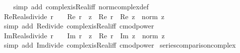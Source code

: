 \begin{isabellebody}
%
\isadelimproof
\ \ %
\endisadelimproof
%
\isatagproof
{}\isamarkupfalse%
\ {\isacharparenleft}{\kern0pt}simp\ add{\isacharcolon}{\kern0pt}\ complex{\isacharunderscore}{\kern0pt}is{\isacharunderscore}{\kern0pt}Real{\isacharunderscore}{\kern0pt}iff\ norm{\isacharunderscore}{\kern0pt}complex{\isacharunderscore}{\kern0pt}def{\isacharparenright}{\kern0pt}%
\endisatagproof
{\isafoldproof}%
%
\isadelimproof
\isanewline
%
\endisadelimproof
\isanewline
{}\isamarkupfalse%
\ Re{\isacharunderscore}{\kern0pt}Reals{\isacharunderscore}{\kern0pt}divide{\isacharcolon}{\kern0pt}\ {\isachardoublequoteopen}r\ {\isasymin}\ {\isasymreal}\ {\isasymLongrightarrow}\ Re\ {\isacharparenleft}{\kern0pt}r\ {\isacharslash}{\kern0pt}\ z{\isacharparenright}{\kern0pt}\ {\isacharequal}{\kern0pt}\ Re\ r\ {\isacharasterisk}{\kern0pt}\ Re\ z\ {\isacharslash}{\kern0pt}\ {\isacharparenleft}{\kern0pt}norm\ z{\isacharparenright}{\kern0pt}\isanewline
%
\isadelimproof
\ \ %
\endisadelimproof
%
\isatagproof
{}\isamarkupfalse%
\ {\isacharparenleft}{\kern0pt}simp\ add{\isacharcolon}{\kern0pt}\ Re{\isacharunderscore}{\kern0pt}divide\ complex{\isacharunderscore}{\kern0pt}is{\isacharunderscore}{\kern0pt}Real{\isacharunderscore}{\kern0pt}iff\ cmod{\isacharunderscore}{\kern0pt}power{}{\isacharparenright}{\kern0pt}%
\endisatagproof
{\isafoldproof}%
%
\isadelimproof
\isanewline
%
\endisadelimproof
\isanewline
{}\isamarkupfalse%
\ Im{\isacharunderscore}{\kern0pt}Reals{\isacharunderscore}{\kern0pt}divide{\isacharcolon}{\kern0pt}\ {\isachardoublequoteopen}r\ {\isasymin}\ {\isasymreal}\ {\isasymLongrightarrow}\ Im\ {\isacharparenleft}{\kern0pt}r\ {\isacharslash}{\kern0pt}\ z{\isacharparenright}{\kern0pt}\ {\isacharequal}{\kern0pt}\ {\isacharminus}{\kern0pt}Re\ r\ {\isacharasterisk}{\kern0pt}\ Im\ z\ {\isacharslash}{\kern0pt}\ {\isacharparenleft}{\kern0pt}norm\ z{\isacharparenright}{\kern0pt}\isanewline
%
\isadelimproof
\ \ %
\endisadelimproof
%
\isatagproof
{}\isamarkupfalse%
\ {\isacharparenleft}{\kern0pt}simp\ add{\isacharcolon}{\kern0pt}\ Im{\isacharunderscore}{\kern0pt}divide\ complex{\isacharunderscore}{\kern0pt}is{\isacharunderscore}{\kern0pt}Real{\isacharunderscore}{\kern0pt}iff\ cmod{\isacharunderscore}{\kern0pt}power{}{\isacharparenright}{\kern0pt}%
\endisatagproof
{\isafoldproof}%
%
\isadelimproof
\isanewline
%
\endisadelimproof
\isanewline
{}\isamarkupfalse%
\ series{\isacharunderscore}{\kern0pt}comparison{\isacharunderscore}{\kern0pt}complex{\isacharcolon}{\kern0pt}\isanewline

\end{isabellebody}
